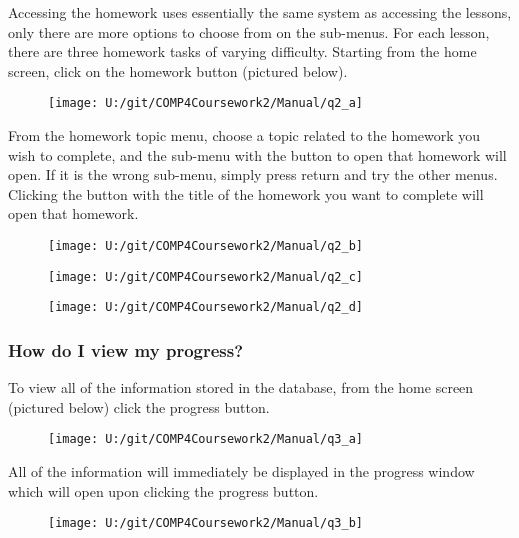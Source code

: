 Accessing the homework uses essentially the same system as accessing the lessons, only there are more options to choose from on the sub-menus. For each lesson, there are three homework tasks of varying difficulty. Starting from the home screen, click on the homework button (pictured below).

\begin{figure}[H]
    \texttt{[image: U:/git/COMP4Coursework2/Manual/q2\_a]}
\end{figure}

From the homework topic menu, choose a topic related to the homework you wish to complete, and the sub-menu with the button to open that homework will open. If it is the wrong sub-menu, simply press return and try the other menus. Clicking the button with the title of the homework you want to complete will open that homework.

\begin{figure}[H]
    \texttt{[image: U:/git/COMP4Coursework2/Manual/q2\_b]}
\end{figure}

\begin{figure}[H]
    \texttt{[image: U:/git/COMP4Coursework2/Manual/q2\_c]}
\end{figure}

\begin{figure}[H]
    \texttt{[image: U:/git/COMP4Coursework2/Manual/q2\_d]}
\end{figure}

\subsubsection{How do I view my progress?}

To view all of the information stored in the database, from the home screen (pictured below) click the progress button.

\begin{figure}[H]
    \texttt{[image: U:/git/COMP4Coursework2/Manual/q3\_a]}
\end{figure}

All of the information will immediately be displayed in the progress window which will open upon clicking the progress button.

\begin{figure}[H]
    \texttt{[image: U:/git/COMP4Coursework2/Manual/q3\_b]}
\end{figure}

